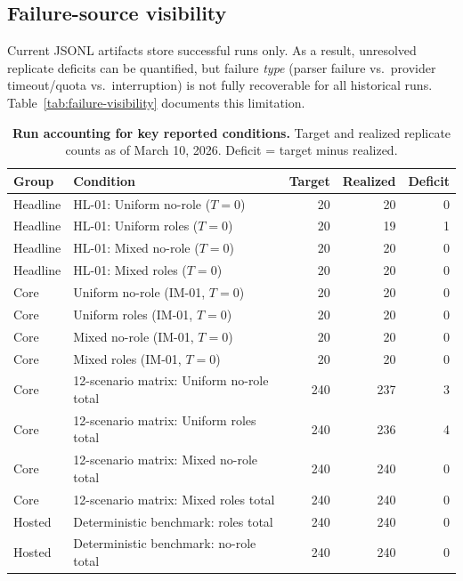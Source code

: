 \documentclass[11pt,onecolumn]{article}
\begin{document}
\subsection{Failure-source visibility}

Current JSONL artifacts store successful runs only. As a result, unresolved
replicate deficits can be quantified, but failure \emph{type} (parser failure
vs.\ provider timeout/quota vs.\ interruption) is not fully recoverable for all
historical runs. Table~\ref{tab:failure-visibility} documents this limitation.

\begin{table}[H]
\caption{\textbf{Run accounting for key reported conditions.}
  Target and realized replicate counts as of March 10, 2026.
  Deficit = target minus realized.}
\label{tab:run-accounting}
\small
\begin{tabular}{@{}llrrr@{}}
\toprule
\textbf{Group} & \textbf{Condition} & \textbf{Target} & \textbf{Realized} & \textbf{Deficit} \\
\midrule
Headline  & HL-01: Uniform no-role ($T=0$)          & 20 & 20 & 0 \\
Headline  & HL-01: Uniform roles ($T=0$)            & 20 & 19 & 1 \\
Headline  & HL-01: Mixed no-role ($T=0$)            & 20 & 20 & 0 \\
Headline  & HL-01: Mixed roles ($T=0$)              & 20 & 20 & 0 \\
\midrule
Core      & Uniform no-role (IM-01, $T=0$)          & 20 & 20 & 0 \\
Core      & Uniform roles (IM-01, $T=0$)            & 20 & 20 & 0 \\
Core      & Mixed no-role (IM-01, $T=0$)            & 20 & 20 & 0 \\
Core      & Mixed roles (IM-01, $T=0$)              & 20 & 20 & 0 \\
Core      & 12-scenario matrix: Uniform no-role total & 240 & 237 & 3 \\
Core      & 12-scenario matrix: Uniform roles total   & 240 & 236 & 4 \\
Core      & 12-scenario matrix: Mixed no-role total   & 240 & 240 & 0 \\
Core      & 12-scenario matrix: Mixed roles total     & 240 & 240 & 0 \\
Hosted    & Deterministic benchmark: roles total      & 240 & 240 & 0 \\
Hosted    & Deterministic benchmark: no-role total    & 240 & 240 & 0 \\

\end{tabular}
\end{table}
\end{document}
